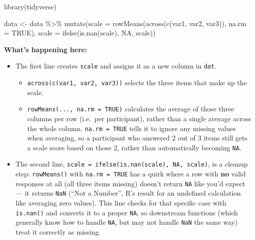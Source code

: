 \documentclass[
  letterpaper,
  DIV=11,
  numbers=noendperiod]{scrreprt}
\newenvironment{Shaded}{\begin{snugshade}}{\end{snugshade}}
\newcommand{\AttributeTok}[1]{\textcolor[rgb]{0.40,0.45,0.13}{#1}}
\newcommand{\ConstantTok}[1]{\textcolor[rgb]{0.56,0.35,0.01}{#1}}
\newcommand{\FunctionTok}[1]{\textcolor[rgb]{0.28,0.35,0.67}{#1}}
\newcommand{\NormalTok}[1]{\textcolor[rgb]{0.00,0.23,0.31}{#1}}
\newcommand{\OtherTok}[1]{\textcolor[rgb]{0.00,0.23,0.31}{#1}}
\newcommand{\SpecialCharTok}[1]{\textcolor[rgb]{0.37,0.37,0.37}{#1}}
\begin{document}
\begin{Shaded}
\begin{Highlighting}[]
\FunctionTok{library}\NormalTok{(tidyverse)}

\NormalTok{data }\OtherTok{\textless{}{-}}\NormalTok{ data }\SpecialCharTok{\%\textgreater{}\%}
  \FunctionTok{mutate}\NormalTok{(}\AttributeTok{scale =} \FunctionTok{rowMeans}\NormalTok{(}\FunctionTok{across}\NormalTok{(}\FunctionTok{c}\NormalTok{(var1, var2, var3)), }\AttributeTok{na.rm =} \ConstantTok{TRUE}\NormalTok{),}
         \AttributeTok{scale =} \FunctionTok{ifelse}\NormalTok{(}\FunctionTok{is.nan}\NormalTok{(scale), }\ConstantTok{NA}\NormalTok{, scale))}
\end{Highlighting}
\end{Shaded}

\textbf{What's happening here:}

\begin{itemize}
\item
  The first line creates \texttt{scale} and assigns it as a new column
  in \texttt{dat}.

  \begin{itemize}
  \item
    \texttt{across(c(var1,\ var2,\ var3))} selects the three items that
    make up the scale.
  \item
    \texttt{rowMeans(...,\ na.rm\ =\ TRUE)} calculates the average of
    those three columns per row (i.e.~per participant), rather than a
    single average across the whole column. \texttt{na.rm\ =\ TRUE}
    tells it to ignore any missing values when averaging, so a
    participant who answered 2 out of 3 items still gets a scale score
    based on those 2, rather than automatically becoming \texttt{NA}.
  \end{itemize}
\item
  The second line,
  \texttt{scale\ =\ ifelse(is.nan(scale),\ NA,\ scale)}, is a cleanup
  step: \texttt{rowMeans()} with \texttt{na.rm\ =\ TRUE} has a quirk
  where a row with \textbf{no} valid responses at all (all three items
  missing) doesn't return \texttt{NA} like you'd expect --- it returns
  \texttt{NaN} (``Not a Number'', R's result for an undefined
  calculation like averaging zero values). This line checks for that
  specific case with \texttt{is.nan()} and converts it to a proper
  \texttt{NA}, so downstream functions (which generally know how to
  handle \texttt{NA}, but may not handle \texttt{NaN} the same way)
  treat it correctly as missing.
\end{itemize}
\end{document}
